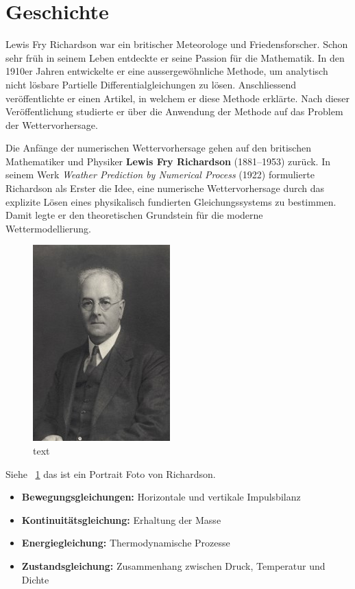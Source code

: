 %
%
%
%
\section{Geschichte\label{geostrophisch:section:teil0}}

Lewis Fry Richardson war ein britischer Meteorologe und Friedensforscher.
Schon sehr früh in seinem Leben entdeckte er seine Passion für die Mathematik. 
In den 1910er Jahren entwickelte er eine aussergewöhnliche Methode, um analytisch nicht lösbare Partielle Differentialgleichungen zu lösen.
Anschliessend veröffentlichte er einen Artikel, in welchem er diese Methode erklärte.
Nach dieser Veröffentlichung studierte er über die Anwendung der Methode auf das Problem der Wettervorhersage. 

Die Anfänge der numerischen Wettervorhersage gehen auf den britischen Mathematiker und Physiker \textbf{Lewis Fry Richardson} (1881–1953) zurück.  
In seinem Werk \textit{Weather Prediction by Numerical Process} (1922) formulierte Richardson als Erster die Idee, eine numerische Wettervorhersage durch das explizite Lösen eines physikalisch fundierten Gleichungssystems zu bestimmen.  
Damit legte er den theoretischen Grundstein für die moderne Wettermodellierung.

\begin{figure}[h]
	\centering
	\includegraphics{Portrait_Richardson.jpg}
	\caption{text}
	\label{bild:portraitRichi}
\end{figure}

Siehe ~\ref{bild:portraitRichi} das ist ein Portrait Foto von Richardson.

\begin{itemize}
	\item \textbf{Bewegungsgleichungen:} Horizontale und vertikale Impulsbilanz
	\item \textbf{Kontinuitätsgleichung:} Erhaltung der Masse
	\item \textbf{Energiegleichung:} Thermodynamische Prozesse
	\item \textbf{Zustandsgleichung:} Zusammenhang zwischen Druck, Temperatur und Dichte
\end{itemize}






